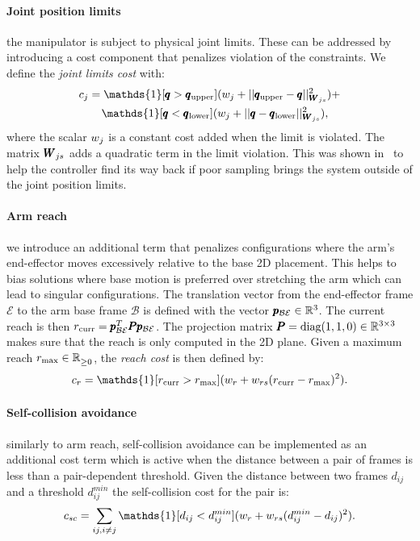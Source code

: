  \paragraph{Joint position limits} the manipulator is subject to physical joint limits. These can be addressed by introducing a cost component that penalizes violation of the constraints. We define the \textit{joint limits cost} with:
 \begin{align}
     &c_{j} = \mathds{1}[\configRobot > \upperLimits](\weightScalar{j} + ||\upperLimits - \configRobot||^2_{\weightMatrix{js}}) + \nonumber\\ 
     &\qquad\mathds{1}[\configRobot < \lowerLimits](\weightScalar{j} +  || \configRobot - \lowerLimits||^2_{\weightMatrix{js}}), 
 \end{align}
 where the scalar $w_{j}$ is a constant cost added when the limit is violated. The matrix $\pmb{W}_{js}$ adds a quadratic term in the limit violation. This was shown in~\cite{williams_information-theoretic_2018} to help the controller find its way back if poor sampling brings the system outside of the joint position limits.
 
 \paragraph{Arm reach} we introduce an additional term that penalizes configurations where the arm's end-effector moves excessively relative to the base 2D placement. This helps to bias solutions where base motion is preferred over stretching the arm which can lead to singular configurations. The translation vector from the end-effector frame $\mathcal{E}$ to the arm base frame $\mathcal{B}$ is defined with the vector $\pmb{p}_{\mathcal{B}\mathcal{E}} \in \mathbb{R}^{3}$. The current reach is then $r_{\text{curr}} =  \pmb{p}_{\mathcal{B}\mathcal{E}}^T \pmb{P} \pmb{p}_{\mathcal{B}\mathcal{E}}$. The projection matrix $\pmb{P} = \text{diag}(1, 1, 0) \in \mathbb{R}^{3 \times 3}$ makes sure that the reach is only computed in the 2D plane. Given a maximum reach $r_{\text{max}} \in \mathbb{R}^{}_{\geq 0}$, the \textit{reach cost} is then defined by:
 \begin{equation}
   c_r = \mathds{1}[r_{\text{curr}} > r_{\text{max}}] (\weightScalar{r} + \weightScalar{rs}(r_{\text{curr}} - r_{\text{max}})^2).    
 \end{equation}

 \paragraph{Self-collision avoidance} similarly to arm reach, self-collision avoidance can be implemented as an additional cost term which is active when the distance between a pair of frames is less than a pair-dependent threshold. Given the distance between two frames $d_{ij}$ and a threshold $d^{min}_{ij}$ the self-collision cost for the pair is:
 \begin{equation}
   c_{sc} = \sum_{ij, i \neq j} \mathds{1}[d_{ij} < d^{min}_{ij}] (\weightScalar{r} + \weightScalar{rs}(d^{min}_{ij} - d_{ij})^2).    
 \end{equation}
 
